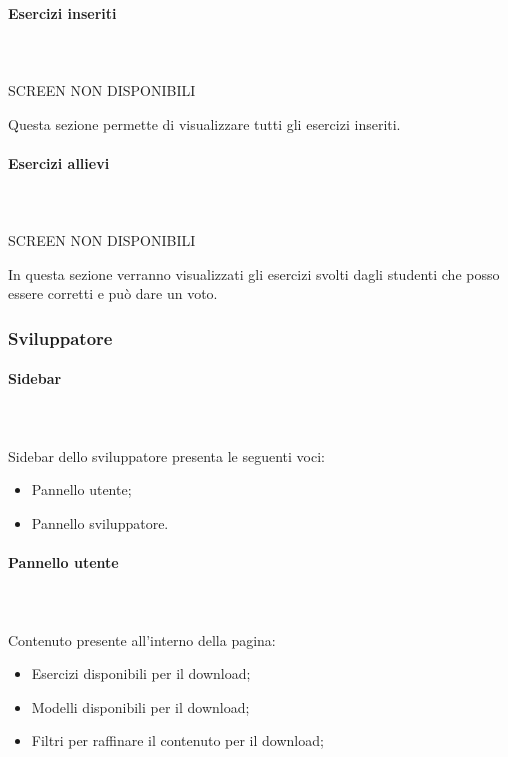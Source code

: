         
        
        \paragraph{Esercizi inseriti}\mbox{}\\ \\
        SCREEN NON DISPONIBILI
        
          Questa sezione permette di visualizzare tutti gli esercizi inseriti.
        
        
        
        
        \paragraph{Esercizi allievi}\mbox{}\\ \\
        SCREEN NON DISPONIBILI
        
          In questa sezione verranno visualizzati gli esercizi svolti dagli studenti che posso essere corretti e può dare un voto.
        
        
        
        
	\newpage
    \subsubsection{Sviluppatore}
    
    	\paragraph{Sidebar}\mbox{} \\ \\
    	  Sidebar dello sviluppatore presenta le seguenti voci:
    		\begin{itemize}
    		\item Pannello utente;
    		\item Pannello sviluppatore.
    		\end{itemize}
    
    
    
    
    	\paragraph{Pannello utente}\mbox{}\\ \\
    	  Contenuto presente all'interno della pagina:
        	\begin{itemize} 
        	\item Esercizi disponibili per il download;
        	\item Modelli disponibili per il download;
        	\item Filtri per raffinare il contenuto per il download;
        	\end{itemize}




